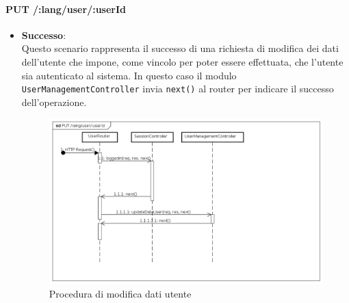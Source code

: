 \paragraph{PUT /:lang/user/:userId}
\begin{itemize}
\item \textbf{Successo}:
\\
Questo scenario rappresenta il successo di una richiesta di modifica dei dati dell'utente che impone, come vincolo per poter essere effettuata, che l'utente sia autenticato al sistema.  
In questo caso il modulo \texttt{UserManagementController} invia \texttt{next()} al router per indicare il successo dell'operazione.
\label{Procedura di modifica dati utente}
\begin{figure}[ht]
	\centering
	\includegraphics[scale=0.40]{UML/DiagrammiDiSequenza/Back-end/PUT_LangUserUseridSuccess.png}
	\caption{Procedura di modifica dati utente}
\end{figure}
\FloatBarrier


\end{itemize}
